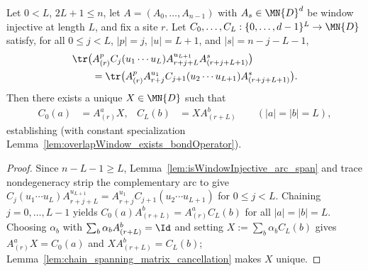 \begin{lemma}%
    \label{lem:chain_overlapWindow_exists_bondOperator}
    \leanok
    Let $0<L$, $2L+1\le n$, let $A=(A_0,\ldots,A_{n-1})$ with $A_s\in\MN{D}^d$
    be window injective at length $L$, and fix a site $r$. Let
    $C_0, \ldots, C_L:\{0,\ldots,d-1\}^L\to\MN{D}$ satisfy, for all $0\le j<L$,
    $|p|=j$, $|u|=L+1$, and $|s|=n-j-L-1$,
    \begin{align}
         & \tr\bigl(A_{(r)}^p C_j(u_1\cdots u_L)
        A_{r+j+L}^{u_{L+1}}A_{(r+j+L+1)}^s\bigr)
        \notag                                   \\
         & \qquad
        =\tr\bigl(A_{(r)}^p A_{r+j}^{u_1}
        C_{j+1}(u_2\cdots u_{L+1})A_{(r+j+L+1)}^s\bigr).
        \notag
    \end{align}
    Then there exists a unique $X\in\MN{D}$ such that
    \begin{align}
        C_0(a) & = A_{(r)}^a X,  &
        C_L(b) & = X A_{(r+L)}^b
        \qquad (|a|=|b|=L),
        \label{eq:peps_chain_bond_operator}
    \end{align}
    establishing \cite[Lemma~5]{Molnar2018NormalPEPS}
    (with constant specialization Lemma~\ref{lem:overlapWindow_exists_bondOperator}).
\end{lemma}
\begin{proof}\leanok
    Since $n-L-1\ge L$, Lemma~\ref{lem:isWindowInjective_arc_span} and trace
    nondegeneracy strip the complementary arc to give
    $C_j(u_1\cdots u_L)A_{r+j+L}^{u_{L+1}}=A_{r+j}^{u_1}C_{j+1}(u_2\cdots u_{L+1})$
    for $0\le j<L$. Chaining $j=0,\ldots,L-1$ yields
    $C_0(a)A_{(r+L)}^b=A_{(r)}^aC_L(b)$ for all $|a|=|b|=L$. Choosing $\alpha_b$
    with $\sum_b\alpha_bA_{(r+L)}^b=\Id$ and setting $X:=\sum_b\alpha_bC_L(b)$
    gives $A_{(r)}^a X=C_0(a)$ and $X A_{(r+L)}^b=C_L(b)$;
    Lemma~\ref{lem:chain_spanning_matrix_cancellation} makes $X$ unique.
\end{proof}

